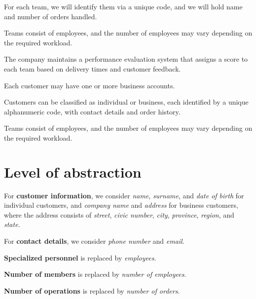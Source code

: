 \begin{tcolorbox}[title=Phrases related to Teams]
For each team, we will identify them via a unique code, and we will hold name and number of orders handled.  

Teams consist of employees, and the number of employees may vary depending on the required workload.  

The company maintains a performance evaluation system that assigns a score to each team based on delivery times and customer feedback.
\end{tcolorbox}

\begin{tcolorbox}[title=Phrases related to Customers]
Each customer may have one or more business accounts.  

Customers can be classified as individual or business, each identified by a unique alphanumeric code, with contact details and order history.
\end{tcolorbox}

\begin{tcolorbox}[title=Phrases related to Employees]
Teams consist of employees, and the number of employees may vary depending on the required workload.
\end{tcolorbox}

\section{Level of abstraction}
For \textbf{customer information}, we consider \textit{name}, \textit{surname}, and \textit{date of birth} for individual customers, and \textit{company name} and \textit{address} for business customers, where the address consists of \textit{street}, \textit{civic number}, \textit{city}, \textit{province}, \textit{region}, and \textit{state}.  

For \textbf{contact details}, we consider \textit{phone number} and \textit{email}.  

\textbf{Specialized personnel} is replaced by \textit{employees}.  

\textbf{Number of members} is replaced by \textit{number of employees}.  

\textbf{Number of operations} is replaced by \textit{number of orders}.

